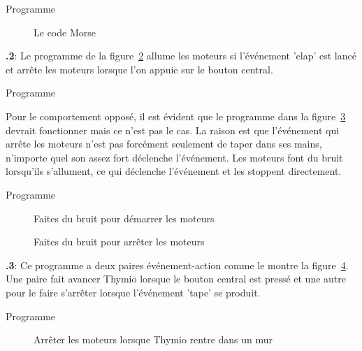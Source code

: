 \documentclass[12pt,a4paper,english]{article}
\begin{document}
{\raggedleft \hfill Programme }

\begin{figure}
\begin{center}
\caption{Le code Morse}\label{fig.morse}
\end{center}
\end{figure}


\textbf{\thesection.2}: Le programme de la figure~\ref{fig.clap-to-start} allume les moteurs si l'événement 'clap' est lancé et arrête les moteurs lorsque l'on appuie sur le bouton central.

{\raggedleft \hfill Programme }

Pour le comportement opposé, il est évident que le programme dans la figure~\ref{fig.clap-to-stop} devrait fonctionner mais ce n'est pas le cas. La raison est que l'événement qui arrête les moteurs n'est pas forcément seulement de taper dans ses mains, n'importe quel son assez fort déclenche l'événement. Les moteurs font du bruit lorsqu'ils s'allument, ce qui déclenche l'événement et les stoppent directement.

{\raggedleft \hfill Programme }

\begin{figure}
\begin{center}
\caption{Faites du bruit pour démarrer les moteurs}\label{fig.clap-to-start}
\end{center}
\end{figure}

\begin{figure}[hbt]
\begin{center}
\caption{Faites du bruit pour arrêter les moteurs}\label{fig.clap-to-stop}
\end{center}
\end{figure}

\textbf{\thesection.3}:
Ce programme a deux paires événement-action comme le montre la figure~\ref{fig.bump}. Une paire fait avancer Thymio lorsque le bouton central est pressé et une autre pour le faire s'arrêter lorsque l'événement 'tape' se produit.

{\raggedleft \hfill Programme }

\begin{figure}[hbt]
\begin{center}
\caption{Arrêter les moteurs lorsque Thymio rentre dans un mur}\label{fig.bump}
\end{center}
\end{figure}
\end{document}
